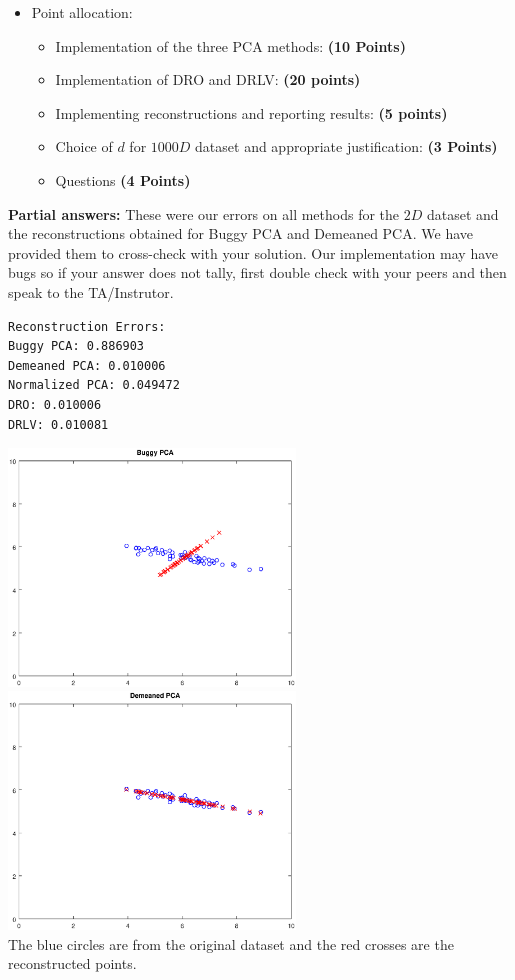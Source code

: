 \begin{itemize}
\item Point allocation:
\begin{itemize}
\item Implementation of the three PCA methods: \textbf{(10 Points)}
\item Implementation of DRO and DRLV: \textbf{(20 points)}
\item Implementing reconstructions and reporting results: \textbf{(5 points)}
\item Choice of $d$ for $1000D$ dataset and appropriate justification:
\textbf{(3 Points)}
\item Questions \textbf{(4 Points)}
\end{itemize}

\end{itemize}



\textbf{Partial answers:}
These were our errors on all methods for the $2D$ dataset and the reconstructions obtained for Buggy PCA and Demeaned PCA.
We have provided them to cross-check with your solution.
Our implementation may have bugs so if your answer does not tally, first double check with your peers and then speak to the TA/Instrutor.
\begin{verbatim}
Reconstruction Errors:
Buggy PCA: 0.886903
Demeaned PCA: 0.010006
Normalized PCA: 0.049472
DRO: 0.010006
DRLV: 0.010081
\end{verbatim}

\includegraphics[width=3in]{pcaprog/buggy_pca} \hspace{0.4in}
\includegraphics[width=3in]{pcaprog/demeaned_pca} \\
The blue circles are from the original dataset and the red crosses are the reconstructed points.

\vspace{0.2in}



